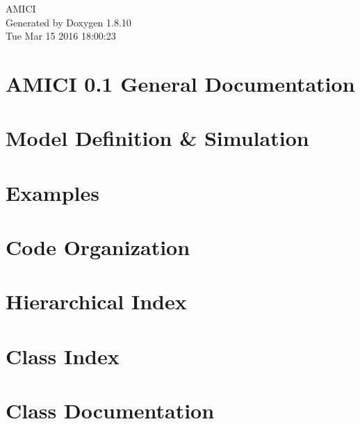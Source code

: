\documentclass[twoside]{article}
\newcommand{\+}{\discretionary{\mbox{\scriptsize$\hookleftarrow$}}{}{}}
\begin{document}
\hypersetup{pageanchor=false,
             bookmarks=true,
             bookmarksnumbered=true,
             pdfencoding=unicode
            }
\begin{titlepage}
\vspace*{7cm}
\begin{center}%
{\Large A\+M\+I\+C\+I }\\
\vspace*{1cm}
{\large Generated by Doxygen 1.8.10}\\
\vspace*{0.5cm}
{\small Tue Mar 15 2016 18:00:23}\\
\end{center}
\end{titlepage}
\tableofcontents
{}
\hypersetup{pageanchor=true}

\section{A\+M\+I\+C\+I 0.1 General Documentation}
\label{index}\hypertarget{index}{}
\section{Model Definition \& Simulation}
\label{def_simu}
\hypertarget{def_simu}{}

\section{Examples}
\label{examples}
\hypertarget{examples}{}

\section{Code Organization}
\label{code}
\hypertarget{code}{}

\section{Hierarchical Index}

\section{Class Index}

\section{Class Documentation}













\end{document}
